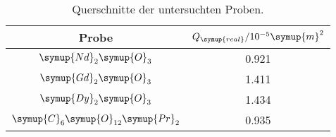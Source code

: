 \begin{table}[!htp]
\centering
\caption{Querschnitte der untersuchten Proben.}
\label{tab:querschnitt}
\begin{tabular}{c c}
\toprule
{Probe} & {$Q_{\symup{real}} / 10^{-5} \symup{m}^2$}  \\
\midrule
$\symup{Nd}_2\symup{O}_3$               &  0.921 \\  
$\symup{Gd}_2\symup{O}_3$               & 1.411 \\
$\symup{Dy}_2\symup{O}_3$               & 1.434 \\
$\symup{C}_6\symup{O}_{12}\symup{Pr}_2$ & 0.935 \\
\bottomrule
\end{tabular}
\end{table}